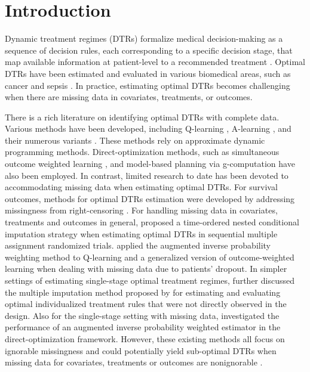 \documentclass[12pt]{article}
\begin{document}
\section{Introduction}

Dynamic treatment regimes (DTRs) formalize medical decision-making as a sequence of decision rules, each corresponding to a specific decision stage, that map available information at patient-level to a recommended treatment \citep{Murphy_2003}. Optimal DTRs have been estimated and evaluated in various biomedical areas, such as cancer \citep{wang2012evaluation} and sepsis \citep{Yu_Zhang_2022}. In practice, estimating optimal DTRs becomes challenging when there are missing data in covariates, treatments, or outcomes.

There is a rich literature on identifying optimal DTRs with complete data. Various methods have been developed, including  Q-learning \citep{Murphy_2003}, A-learning \citep{Schulte_et_al_2014}, and their numerous variants \citep{Kosorok_Laber_2019}. These methods rely on approximate dynamic programming methods. Direct-optimization methods, such as simultaneous outcome weighted learning \citep{Zhao_et_al_2015}, and model-based planning via g-computation \citep{Xu_et_al_2016} have also been employed. In contrast, limited research to date has been devoted to accommodating missing data when estimating optimal DTRs. For survival outcomes,  methods for optimal DTRs estimation were developed by addressing missingness from right-censoring \citep{Simoneau_et_al_2020}.  For handling missing data in covariates, treatments and outcomes in general, \cite{Shortreed_et_al_2014} proposed a time-ordered nested conditional imputation strategy when estimating optimal DTRs in sequential multiple assignment randomized trials. \cite{Dong_et_al_2020} applied the augmented inverse probability weighting method to Q-learning and a generalized version of outcome-weighted learning when dealing with missing data due to patients' dropout. In simpler settings of estimating single-stage optimal treatment regimes, 
\cite{Shen_Hubbard_Linn_2023} further discussed the multiple imputation method proposed by \cite{Shortreed_et_al_2014}  for estimating and evaluating optimal individualized treatment rules that were not directly observed in the design. Also for the single-stage setting with missing data,  \cite{Huang_Zhou_2020} investigated the performance of an augmented inverse probability weighted estimator in the direct-optimization framework.  However, these existing methods all focus on ignorable missingness and could potentially yield sub-optimal DTRs when missing data for covariates, treatments or outcomes are nonignorable  \citep{Little_Rubin_2014}.  
\end{document}
